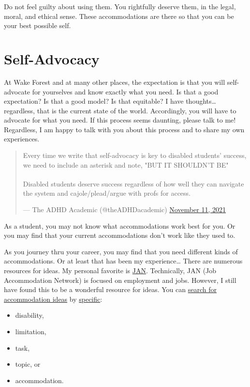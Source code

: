 Do not feel guilty about using them.
You rightfully deserve them, in the legal, moral, and ethical sense.
These accommodations are there so that you can be your best possible self.

\hypertarget{self-advocacy}{%
\section{Self-Advocacy}\label{self-advocacy}}

At Wake Forest and at many other places, the expectation is that you will self-advocate for yourselves and know exactly what you need. Is that a good expectation? Is that a good model? Is that equitable? I have thoughts\ldots{} regardless, that is the current state of the world. Accordingly, you will have to advocate for what you need. If this process seems daunting, please talk to me! Regardless, I am happy to talk with you about this process and to share my own experiences.

\begin{quote}
Every time we write that self-advocacy is key to disabled students'
success, we need to include an asterisk and note, "BUT IT SHOULDN'T
BE"\\
~\\
Disabled students deserve success regardless of how well they can
navigate the system and cajole/plead/argue with profs for access.

\begin{flushright}--- The ADHD Academic (@theADHDacademic) \href{https://twitter.com/theADHDacademic/status/1458876178580881410}{November 11,
2021}\end{flushright}
\end{quote}

As a student, you may not know what accommodations work best for you. Or you may find that your current accommodations don't work like they used to.

As you journey thru your career, you may find that you need different kinds of accommodations. Or at least that has been my experience\ldots{} There are numerous resources for ideas.
My personal favorite is \href{https://askjan.org/}{JAN}. Technically, JAN (Job Accommodation Network) is focused on employment and jobs.
However, I still have found this to be a wonderful resource for ideas.
You can \href{https://askjan.org/soar.cfm}{search for accommodation ideas} by \href{https://askjan.org/a-to-z.cfm}{specific}:

\begin{itemize}
\tightlist
\item
  disability,
\item
  limitation,
\item
  task,
\item
  topic, or
\item
  accommodation.
\end{itemize}

